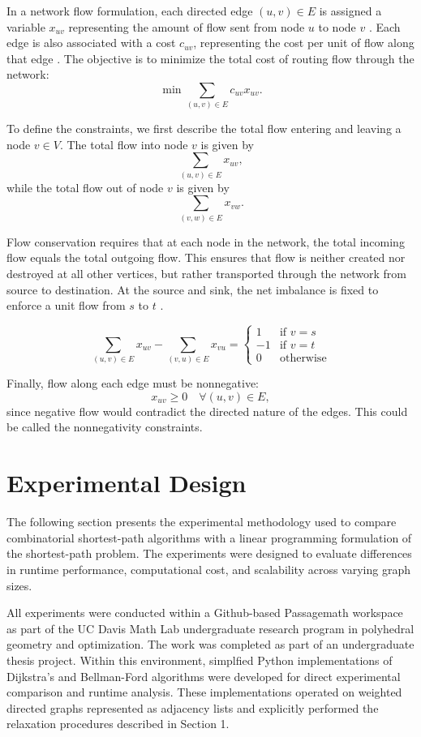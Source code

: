 \documentclass[12pt]{report}
\begin{document}
In a network flow formulation, each directed edge $(u,v) \in E$ is assigned a variable $x_{uv}$ representing the amount of flow sent from node $u$ to node $v$ \cite{Vanderbei}. Each edge is also associated with a cost $c_{uv}$, representing the cost per unit of flow along that edge \cite{Vanderbei}. The objective is to minimize the total cost of routing flow through the network:
\[
\min \sum_{(u,v)\in E} c_{uv} x_{uv}.
\]

To define the constraints, we first describe the total flow entering and leaving a node $v \in V$. The total flow into node $v$ is given by
\[
\sum_{(u,v)\in E} x_{uv},
\]
while the total flow out of node $v$ is given by
\[
\sum_{(v,w)\in E} x_{vw}.
\]

Flow conservation requires that at each node in the network, the total incoming flow equals the total outgoing flow. This ensures that flow is neither created nor destroyed at all other vertices, but rather transported through the network from source to destination. At the source and sink, the net imbalance is fixed to enforce a unit flow from $s$ to $t$ \cite{Vanderbei}.

\[
\sum_{(u,v)\in E} x_{uv} - \sum_{(v,u)\in E} x_{vu} =
\begin{cases}
1 & \text{if } v = s \\
-1 & \text{if } v = t \\
0 & \text{otherwise}
\end{cases}
\]

Finally, flow along each edge must be nonnegative:
\[
x_{uv} \ge 0 \quad \forall (u,v)\in E,
\]
since negative flow would contradict the directed nature of the edges. This could be called the nonnegativity constraints. 



\chapter{Experimental Design}

The following section presents the experimental methodology used to compare combinatorial shortest-path algorithms with a linear programming formulation of the shortest-path problem. The experiments were designed to evaluate differences in runtime performance, computational cost, and scalability across varying graph sizes. 

All experiments were conducted within a Github-based Passagemath workspace as part of the UC Davis Math Lab undergraduate research program in polyhedral geometry and optimization. The work was completed as part of an undergraduate thesis project. Within this environment, simplfied Python implementations of Dijkstra's and Bellman-Ford algorithms were developed for direct experimental comparison and runtime analysis. These implementations operated on weighted directed graphs represented as adjacency lists and explicitly performed the relaxation procedures described in Section 1.
\end{document}
